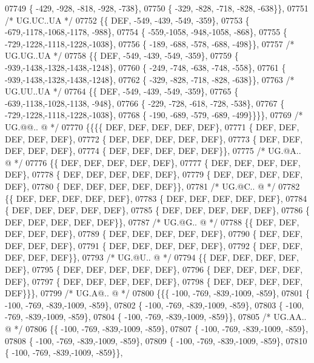 \begin{DoxyCode}
07749 \{ -429, -928, -818, -928, -738\},
07750 \{ -329, -828, -718, -828, -638\}\},
07751 \textcolor{comment}{/* UG.UC..UA */}
07752 \{\{  DEF, -549, -439, -549, -359\},
07753 \{ -679,-1178,-1068,-1178, -988\},
07754 \{ -559,-1058, -948,-1058, -868\},
07755 \{ -729,-1228,-1118,-1228,-1038\},
07756 \{ -189, -688, -578, -688, -498\}\},
07757 \textcolor{comment}{/* UG.UG..UA */}
07758 \{\{  DEF, -549, -439, -549, -359\},
07759 \{ -939,-1438,-1328,-1438,-1248\},
07760 \{ -249, -748, -638, -748, -558\},
07761 \{ -939,-1438,-1328,-1438,-1248\},
07762 \{ -329, -828, -718, -828, -638\}\},
07763 \textcolor{comment}{/* UG.UU..UA */}
07764 \{\{  DEF, -549, -439, -549, -359\},
07765 \{ -639,-1138,-1028,-1138, -948\},
07766 \{ -229, -728, -618, -728, -538\},
07767 \{ -729,-1228,-1118,-1228,-1038\},
07768 \{ -190, -689, -579, -689, -499\}\}\}\},
07769 \textcolor{comment}{/* UG.@@.. @ */}
07770 \{\{\{\{  DEF,  DEF,  DEF,  DEF,  DEF\},
07771 \{  DEF,  DEF,  DEF,  DEF,  DEF\},
07772 \{  DEF,  DEF,  DEF,  DEF,  DEF\},
07773 \{  DEF,  DEF,  DEF,  DEF,  DEF\},
07774 \{  DEF,  DEF,  DEF,  DEF,  DEF\}\},
07775 \textcolor{comment}{/* UG.@A.. @ */}
07776 \{\{  DEF,  DEF,  DEF,  DEF,  DEF\},
07777 \{  DEF,  DEF,  DEF,  DEF,  DEF\},
07778 \{  DEF,  DEF,  DEF,  DEF,  DEF\},
07779 \{  DEF,  DEF,  DEF,  DEF,  DEF\},
07780 \{  DEF,  DEF,  DEF,  DEF,  DEF\}\},
07781 \textcolor{comment}{/* UG.@C.. @ */}
07782 \{\{  DEF,  DEF,  DEF,  DEF,  DEF\},
07783 \{  DEF,  DEF,  DEF,  DEF,  DEF\},
07784 \{  DEF,  DEF,  DEF,  DEF,  DEF\},
07785 \{  DEF,  DEF,  DEF,  DEF,  DEF\},
07786 \{  DEF,  DEF,  DEF,  DEF,  DEF\}\},
07787 \textcolor{comment}{/* UG.@G.. @ */}
07788 \{\{  DEF,  DEF,  DEF,  DEF,  DEF\},
07789 \{  DEF,  DEF,  DEF,  DEF,  DEF\},
07790 \{  DEF,  DEF,  DEF,  DEF,  DEF\},
07791 \{  DEF,  DEF,  DEF,  DEF,  DEF\},
07792 \{  DEF,  DEF,  DEF,  DEF,  DEF\}\},
07793 \textcolor{comment}{/* UG.@U.. @ */}
07794 \{\{  DEF,  DEF,  DEF,  DEF,  DEF\},
07795 \{  DEF,  DEF,  DEF,  DEF,  DEF\},
07796 \{  DEF,  DEF,  DEF,  DEF,  DEF\},
07797 \{  DEF,  DEF,  DEF,  DEF,  DEF\},
07798 \{  DEF,  DEF,  DEF,  DEF,  DEF\}\}\},
07799 \textcolor{comment}{/* UG.A@.. @ */}
07800 \{\{\{ -100, -769, -839,-1009, -859\},
07801 \{ -100, -769, -839,-1009, -859\},
07802 \{ -100, -769, -839,-1009, -859\},
07803 \{ -100, -769, -839,-1009, -859\},
07804 \{ -100, -769, -839,-1009, -859\}\},
07805 \textcolor{comment}{/* UG.AA.. @ */}
07806 \{\{ -100, -769, -839,-1009, -859\},
07807 \{ -100, -769, -839,-1009, -859\},
07808 \{ -100, -769, -839,-1009, -859\},
07809 \{ -100, -769, -839,-1009, -859\},
07810 \{ -100, -769, -839,-1009, -859\}\},

\end{DoxyCode}
